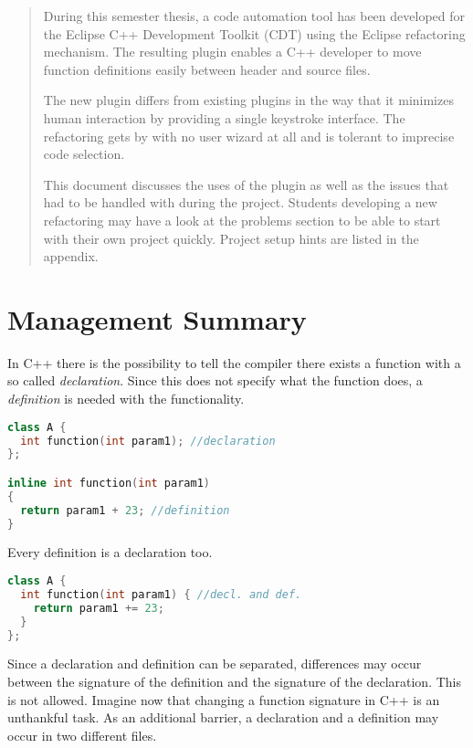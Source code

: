 \begin{abstract}

During this semester thesis, a code automation tool has been developed for the 
Eclipse C++ Development Toolkit (CDT) using the Eclipse refactoring mechanism. 
The resulting plugin enables a C++ developer to move function definitions easily 
between header and source files.

The new plugin differs from existing plugins in the way that it minimizes human 
interaction by providing a single keystroke interface. The refactoring gets by 
with no user wizard at all and is tolerant to imprecise code selection. 

This document discusses the uses of the plugin as well as the issues that had 
to be handled with during the project. Students developing a new refactoring may 
have a look at the problems section to be able to start with their own project 
quickly. Project setup hints are listed in the appendix.
\end{abstract}

\chapter*{Management Summary}

In C++ there is the possibility to tell the compiler there exists a function
with a so called \textit{declaration}. Since
this does not specify what the function does, a \textit{definition} is needed
with the functionality.

\begin{lstlisting}[caption={class with declaration and separated definition},
label={declanddef}, language=C++]
class A {
  int function(int param1); //declaration
};

inline int function(int param1)
{
  return param1 + 23; //definition
}
\end{lstlisting}

Every definition is a declaration too.

\begin{lstlisting}[caption={class with declaration and definition},
label={defonly}, language=C++]
class A {
  int function(int param1) { //decl. and def.
    return param1 += 23;
  }
};
\end{lstlisting}

Since a declaration and definition can be separated, differences may occur
between the signature of the definition and the signature of the declaration.
This is not allowed. 
Imagine now that changing a function signature in C++ is an unthankful task.
As an additional barrier, a declaration and a definition may occur in two
different files.

